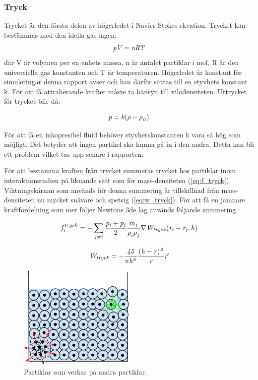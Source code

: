 \documentclass[a4paper,12pt,oneside,final]{extarticle}
\begin{document}
\subsubsection{Tryck}
Trycket är den första delen av högerledet i Navier Stokes ekvation.
Trycket kan bestämmas med den idella gas lagen:
\begin{equation}
{\it pV = nRT}
\end{equation}
där V är volymen per en enhets massa, n är antalet partiklar i mol, R är den universiella gas konstanten och T är temperaturen.
Högerledet är konstant för simuleringar denna rapport avser och kan därför sättas till en styvhets konstant k. 
För att få attraherande krafter måste ta hänsyn till vilodensiteten. Uttrycket för trycket blir då:

\begin{equation}
{\it p = k(\rho - \rho^{}_{0})}
\end{equation}


För att få en inkopresibel fluid behöver styvhetskonstanten k vara så hög som möjligt. Det betyder att ingen partikel ska kunna gå in i den andra. Detta kan bli ett problem vilket tas upp senare i rapporten.

För att bestämma kraften från trycket summeras trycket hos partiklar inom interaktionsradien på liknande sätt som för mass-densiteten (\ref{eq:f_tryck}).
Viktningskärnan som används för denna summering är tillskillnad från mass-densiteten nu mycket snävare och spetsig (\ref{eq:w_tryck}).
För att få en jämnare kraftfördelning som mer följer Newtons 3de lag används följande summering.

\begin{equation} \label{eq:f_tryck}
f^{tryck}_i = - \sum_{j \neq i} \frac{\it p_i + p_j}{2} \frac{m_j}{\rho^{}_{i} \rho^{}_{j}} \nabla {\it W_{tryck} (r_i - r_j,h)}
\end{equation}

\begin{equation} \label{eq:w_tryck}
{\it W_{tryck} = -\frac{45}{\pi h^6}\frac{(h-r)^2}{r}} \vec{r}
\end{equation}


\begin{figure}[H]
  \centering
    \includegraphics[width=0.5\textwidth]{bilder/partiklar_komprimering}
  \caption{Partiklar som verkar på andra partiklar.}
\end{figure}
\end{document}

